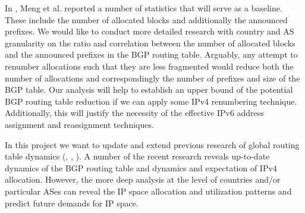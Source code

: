 \documentclass[conference]{IEEEtran}
\begin{document}
In \cite{Meng:2005:IPv4-address}, Meng et al. reported a number of statistics that will serve as a baseline.  These include the number of allocated blocks and additionally the announced prefixes.  We would like to conduct more detailed research with country and AS granularity on the ratio and correlation between the number of allocated blocks and the announced prefixes in the BGP routing table. Arguably, any attempt to renumber allocations such that they are less fragmented would reduce both the number of allocations and correspondingly the number of prefixes and size of the BGP table. Our analysis will help to establish an upper bound of the potential BGP routing table reduction if we can apply some IPv4 renumbering technique. Additionally, this will justify the necessity of the effective IPv6 address assignment and reassignment techniques.

% 
% 

% 
% 



In this project we want to update and extend previous research of global routing table dynamics (\cite{Xu:2003:IPv4-Address}, \cite{Meng:2003:An-analysis-of-BGP-routing}, \cite{Meng:2005:IPv4-address}). A number of the recent research \cite{::BGP-Reports} \cite{::IPv4-Address-Report} reveals up-to-date dynamics of the BGP routing table and dynamics and expectation of IPv4 allocation. However, the more deep analysis at the level of countries and/or particular ASes can reveal the IP space allocation and utilization patterns and predict future demands for IP space.


\end{document}
